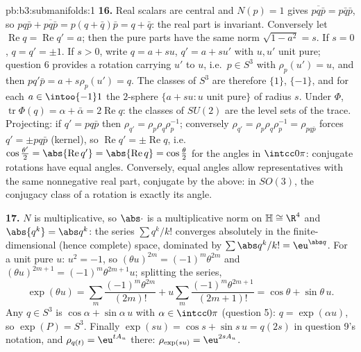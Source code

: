\begin{solution}{pb:b3:submanifolds:1}
\textbf{16.} Real scalars are central and $N(p) = 1$ gives
$\overline{pq\bar p} = p\bar q\bar p$, so $pq\bar p +
\overline{pq\bar p} = p(q + \bar q)\bar p = q + \bar q$:
the real part is invariant. Conversely let
$\operatorname{Re}q = \operatorname{Re}q' = a$; then the
pure parts have the same norm $\sqrt{1 - a^2} = s$. If $s =
0$, $q = q' = \pm1$. If $s > 0$, write $q = a + su$, $q' =
a + su'$ with $u, u'$ unit pure; question 6 provides a
rotation carrying $u'$ to $u$, i.e.\ $p \in S^3$ with
$\rho_p(u') = u$, and then $pq'\bar p = a + s\rho_p(u') =
q$. The classes of $S^3$ are therefore $\{1\}$, $\{-1\}$,
and for each $a \in \intoo{-1}1$ the $2$-sphere $\{a + su :
u \text{ unit pure}\}$ of radius $s$. Under $\Phi$,
$\operatorname{tr}\Phi(q) = \alpha + \bar\alpha =
2\operatorname{Re}q$: the classes of $SU(2)$ are the level
sets of the trace. Projecting: if $q' = pq\bar p$ then
$\rho_{q'} = \rho_p\rho_q\rho_p^{-1}$; conversely
$\rho_{q'} = \rho_p\rho_q\rho_p^{-1} = \rho_{pq\bar p}$
forces $q' = \pm pq\bar p$ (kernel), so
$\operatorname{Re}q' = \pm\operatorname{Re}q$, i.e.\
$\cos\frac{\theta'}2 = \abs{\operatorname{Re}q'} =
\abs{\operatorname{Re}q} = \cos\frac\theta2$ for the angles
in $\intcc0\pi$: conjugate rotations have equal angles.
Conversely, equal angles allow representatives with the
same nonnegative real part, conjugate by the above: in
$SO(3)$, the conjugacy class of a rotation is exactly its
angle.

\textbf{17.} $N$ is multiplicative, so $\abs\cdot$ is a
multiplicative norm on $\mathbb H \cong \R^4$ and
$\abs{q^k} = \abs q^k$: the series $\sum q^k/k!$ converges
absolutely in the finite-dimensional (hence complete)
space, dominated by $\sum\abs q^k/k! = \eu^{\abs q}$. For a
unit pure $u$: $u^2 = -1$, so $(\theta u)^{2m} =
(-1)^m\theta^{2m}$ and $(\theta u)^{2m+1} =
(-1)^m\theta^{2m+1}u$; splitting the series,
\[
\exp(\theta u) = \sum_m\frac{(-1)^m\theta^{2m}}{(2m)!} +
u\sum_m\frac{(-1)^m\theta^{2m+1}}{(2m+1)!} = \cos\theta +
\sin\theta\,u .
\]
Any $q \in S^3$ is $\cos\alpha + \sin\alpha\,u$ with
$\alpha \in \intcc0\pi$ (question 5): $q = \exp(\alpha u)$,
so $\exp(P) = S^3$. Finally $\exp(su) = \cos s + \sin s\,u
= q(2s)$ in question 9's notation, and $\rho_{q(t)} =
\eu^{tA_u}$ there: $\rho_{\exp(su)} = \eu^{2sA_u}$.


\end{solution}
